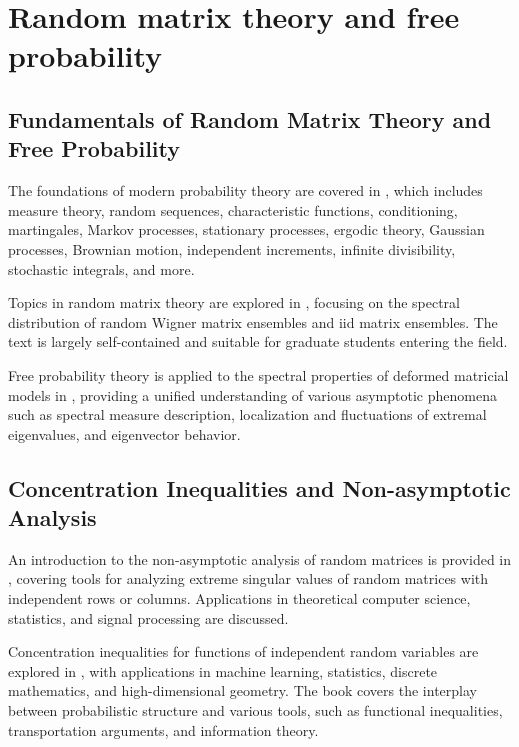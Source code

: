 \documentclass{article}
\begin{document}
\section{Random matrix theory and free probability}

\subsection{Fundamentals of Random Matrix Theory and Free Probability}

The foundations of modern probability theory are covered in \cite{Kallenberg2021FoundationsOM}, which includes measure theory, random sequences, characteristic functions, conditioning, martingales, Markov processes, stationary processes, ergodic theory, Gaussian processes, Brownian motion, independent increments, infinite divisibility, stochastic integrals, and more. 

Topics in random matrix theory are explored in \cite{Tao2012TopicsIR}, focusing on the spectral distribution of random Wigner matrix ensembles and iid matrix ensembles. The text is largely self-contained and suitable for graduate students entering the field. 

Free probability theory is applied to the spectral properties of deformed matricial models in \cite{Capitaine2016SpectrumOD}, providing a unified understanding of various asymptotic phenomena such as spectral measure description, localization and fluctuations of extremal eigenvalues, and eigenvector behavior.

\subsection{Concentration Inequalities and Non-asymptotic Analysis}

An introduction to the non-asymptotic analysis of random matrices is provided in \cite{Vershynin2010IntroductionTT}, covering tools for analyzing extreme singular values of random matrices with independent rows or columns. Applications in theoretical computer science, statistics, and signal processing are discussed.

Concentration inequalities for functions of independent random variables are explored in \cite{Boucheron2013ConcentrationI}, with applications in machine learning, statistics, discrete mathematics, and high-dimensional geometry. The book covers the interplay between probabilistic structure and various tools, such as functional inequalities, transportation arguments, and information theory.
\end{document}
